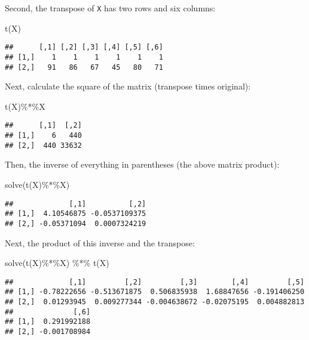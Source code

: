 \documentclass[
]{book}
\newenvironment{Shaded}{\begin{snugshade}}{\end{snugshade}}
\newcommand{\FunctionTok}[1]{\textcolor[rgb]{0.00,0.00,0.00}{#1}}
\newcommand{\NormalTok}[1]{#1}
\newcommand{\SpecialCharTok}[1]{\textcolor[rgb]{0.00,0.00,0.00}{#1}}
\begin{document}
Second, the transpose of \texttt{X} has two rows and six columns:

\begin{Shaded}
\begin{Highlighting}[]
\FunctionTok{t}\NormalTok{(X)}
\end{Highlighting}
\end{Shaded}

\begin{verbatim}
##      [,1] [,2] [,3] [,4] [,5] [,6]
## [1,]    1    1    1    1    1    1
## [2,]   91   86   67   45   80   71
\end{verbatim}

Next, calculate the square of the matrix (transpose times original):

\begin{Shaded}
\begin{Highlighting}[]
\FunctionTok{t}\NormalTok{(X)}\SpecialCharTok{\%*\%}\NormalTok{X}
\end{Highlighting}
\end{Shaded}

\begin{verbatim}
##      [,1]  [,2]
## [1,]    6   440
## [2,]  440 33632
\end{verbatim}

Then, the inverse of everything in parentheses (the above matrix product):

\begin{Shaded}
\begin{Highlighting}[]
\FunctionTok{solve}\NormalTok{(}\FunctionTok{t}\NormalTok{(X)}\SpecialCharTok{\%*\%}\NormalTok{X)}
\end{Highlighting}
\end{Shaded}

\begin{verbatim}
##             [,1]          [,2]
## [1,]  4.10546875 -0.0537109375
## [2,] -0.05371094  0.0007324219
\end{verbatim}

Next, the product of this inverse and the transpose:

\begin{Shaded}
\begin{Highlighting}[]
\FunctionTok{solve}\NormalTok{(}\FunctionTok{t}\NormalTok{(X)}\SpecialCharTok{\%*\%}\NormalTok{X) }\SpecialCharTok{\%*\%} \FunctionTok{t}\NormalTok{(X)}
\end{Highlighting}
\end{Shaded}

\begin{verbatim}
##             [,1]         [,2]         [,3]        [,4]         [,5]
## [1,] -0.78222656 -0.513671875  0.506835938  1.68847656 -0.191406250
## [2,]  0.01293945  0.009277344 -0.004638672 -0.02075195  0.004882813
##              [,6]
## [1,]  0.291992188
## [2,] -0.001708984
\end{verbatim}
\end{document}
